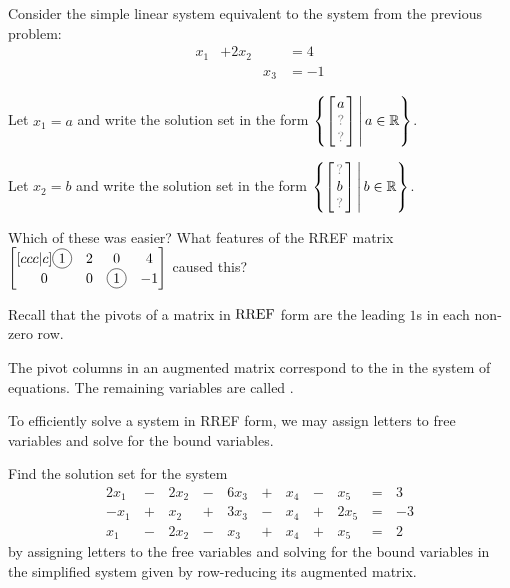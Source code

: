 \begin{applicationActivities}
\begin{activity}{10}
Consider the simple linear system equivalent to the system
from the previous problem:
	\begin{alignat*}{3}
		x_1 &+ 2x_2 & &= 4\\
	     	 & &x_3 &= -1
	\end{alignat*}
\begin{subactivity}
Let \(x_1=a\) and write the solution set in the form
\(
  \left\{
    \begin{bmatrix} a \\ \unknown \\ \unknown \end{bmatrix}
  \,\middle|\,
    a \in \IR
  \right\}
\).
\end{subactivity}
\begin{subactivity}
Let \(x_2=b\) and write the solution set in the form
\(
  \left\{
    \begin{bmatrix} \unknown \\ b \\ \unknown \end{bmatrix}
  \,\middle|\,
    b \in \IR
  \right\}
\).
\end{subactivity}
\begin{subactivity}
Which of these was easier?  What features of the RREF matrix
\(
  \begin{bmatrix}[ccc|c]
    \circledNumber{1} & 2 & 0 & 4 \\
    0 & 0 & \circledNumber{1} & -1
  \end{bmatrix}
\) caused this?
\end{subactivity}
\end{activity}

\begin{definition}
Recall that the pivots of a matrix in \(\operatorname{RREF}\) form are the leading
\(1\)s in each non-zero row.

The pivot columns in an augmented matrix correspond to the
 in the system of equations.
The remaining variables are called .

To efficiently solve a system in RREF form, we may assign letters to free
variables and solve for the bound variables.
\end{definition}

\begin{activity}{10}
Find the solution set for the system
\begin{alignat*}{6}
2x_1&\,-\,&2x_2&\,-\,&6x_3&\,+\,&x_4&\,-\,&x_5&\,=\,&3 \\
-x_1&\,+\,&x_2&\,+\,&3x_3&\,-\,&x_4&\,+\,&2x_5 &\,=\,& -3 \\
x_1&\,-\,&2x_2&\,-\,&x_3&\,+\,&x_4&\,+\,&x_5 &\,=\,& 2
\end{alignat*}
by assigning letters to the free variables and solving for the bound variables
in the simplified system given by row-reducing its augmented matrix.
\end{activity}


\end{applicationActivities}
